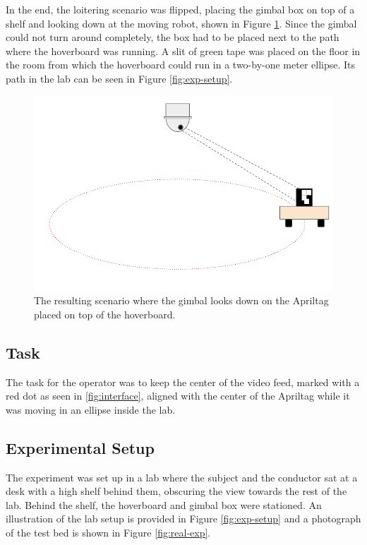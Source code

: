 \documentclass[nofilelist]{cslthse-msc}
\begin{document}
In the end, the loitering scenario was flipped, placing the gimbal box on top of a shelf and looking down at the moving robot, shown in Figure \ref{fig:testbed-idea-2}. Since the gimbal could not turn around completely, the box had to be placed next to the path where the hoverboard was running. A slit of green tape was placed on the floor in the room from which the hoverboard could run in a two-by-one meter ellipse. Its path in the lab can be seen in Figure \ref{fig:exp-setup}.

\begin{figure}[htp]
   \centering
   \includegraphics[width=.6\textwidth]{images/testbed2.png}
   \caption{The resulting scenario where the gimbal looks down on the Apriltag placed on top of the hoverboard.}
   \label{fig:testbed-idea-2}
\end{figure}

\subsection{Task}
The task for the operator was to keep the center of the video feed, marked with a red dot as seen in \ref{fig:interface}, aligned with the center of the Apriltag while it was moving in an ellipse inside the lab.

\subsection{Experimental Setup}
The experiment was set up in a lab where the subject and the conductor sat at a desk with a high shelf behind them, obscuring the view towards the rest of the lab. Behind the shelf, the hoverboard and gimbal box were stationed. An illustration of the lab setup is provided in Figure \ref{fig:exp-setup} and a photograph of the test bed is shown in Figure \ref{fig:real-exp}.
\end{document}
